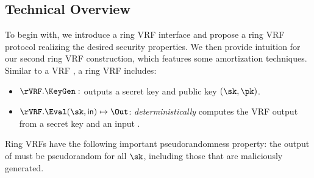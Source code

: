 
\subsection{Technical Overview}
\label{sec:overview}


To begin with, we introduce a ring VRF interface and propose a ring VRF protocol realizing the desired security properties.
We then provide intuition for our second ring VRF construction, which features some amortization techniques.
Similar to a VRF \cite{vrf_micali}, a ring VRF includes:

\begin{itemize}
\item $\rVRF.\KeyGen: $ outputs a secret key and public key $ (\sk, \pk)$.

\item $\rVRF.\Eval(\sk,\msg) \mapsto \Out$:  \emph{deterministically} computes the VRF output \Out from a secret key \sk and an input \msg.
\end{itemize}
%


Ring VRFs have the following important pseudorandomness property: the output of \Eval must be pseudorandom for all $ \sk $, including those that are maliciously generated.


